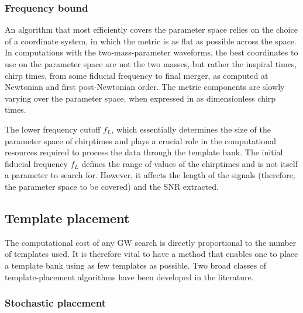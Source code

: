 \documentclass[binding=0.6cm, LaM]{sapthesis}
\begin{document}
\subsubsection{Frequency bound}

	An algorithm that most efficiently covers the parameter space relies on the choice of a coordinate system, 
	in which the metric is as flat as possible across the space.
	In computations with the two-mass-parameter waveforms, 
	the best coordinates to use on the parameter space are not the two masses, 
	but rather the inspiral times, chirp times, from some fiducial frequency to final merger, 
	as computed at Newtonian and first post-Newtonian order. 
	The metric components are slowly varying over the parameter space, 
	when expressed in as dimensionless chirp times.
	

        The lower frequency cutoff $f_L$, which essentially determines the size of the parameter space
        of chirptimes and plays a crucial role in the computational resources required
        to process the data through the template bank.
        The initial fiducial frequency $f_L$ defines the range of values of the chirptimes
        and is not itself a parameter to search for.
        However, it affects the length of the signals
        (therefore, the parameter space to be covered) and the SNR extracted.

\subsection{Template placement}


	The computational cost of any GW search
	 is directly proportional to the number of templates used.
	It is therefore vital to have a method that enables one 
	to place a template bank using as few templates as possible. 
	Two broad classes of template-placement algorithms 
	have been developed in the literature. 

\subsubsection{Stochastic placement}
\end{document}
